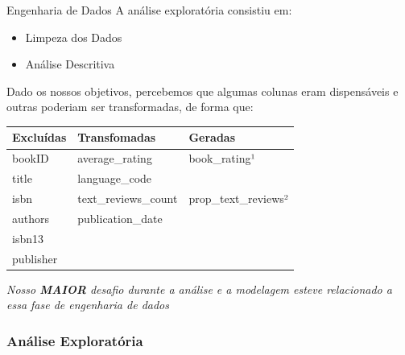 \documentclass[
  9 pt,
  ignorenonframetext,
]{beamer}
\providecommand{\tightlist}{%
  \setlength{\itemsep}{0pt}\setlength{\parskip}{0pt}}
\begin{document}
\begin{frame}{Engenharia de Dados}
A análise exploratória consistiu em:

\begin{itemize}
\tightlist
\item
  Limpeza dos Dados
\item
  Análise Descritiva
\end{itemize}

Dado os nossos objetivos, percebemos que algumas colunas eram
dispensáveis e outras poderiam ser transformadas, de forma que:

\begin{table}[H]
\centering
\begin{tabular}{lll}
\toprule
Excluídas & Transfomadas & Geradas\\
\midrule
bookID & average\_rating & book\_rating¹\\
title & language\_code & \\
isbn & text\_reviews\_count & prop\_text\_reviews²\\
authors & publication\_date & \\
isbn13 &  & \\
\addlinespace
publisher &  & \\
\bottomrule
\end{tabular}
\end{table}

\begin{block}{\emph{Nosso \textbf{MAIOR} desafio durante a análise e a
modelagem esteve relacionado a essa fase de engenharia de dados}}
\protect\hypertarget{nosso-maior-desafio-durante-a-anuxe1lise-e-a-modelagem-esteve-relacionado-a-essa-fase-de-engenharia-de-dados}{}
\end{block}
\end{frame}

\hypertarget{anuxe1lise-exploratuxf3ria}{%
\subsubsection{Análise Exploratória}\label{anuxe1lise-exploratuxf3ria}}
\end{document}
